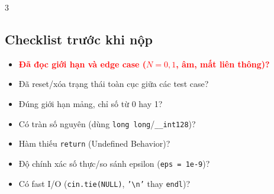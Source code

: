 \documentclass[landscape, 8pt, a4paper, oneside]{extarticle}
\begin{document}
\begin{multicols}{3}
\subsection{Checklist trước khi nộp}
\begin{itemize}
    \setlength{\itemsep}{0pt}
    \setlength{\parsep}{0pt}
    \item \textcolor{red}{\textbf{Đã đọc giới hạn và edge case ($N=0,1$, âm, mất liên thông)?}}
    \item Đã reset/xóa trạng thái toàn cục giữa các test case?
    \item Đúng giới hạn mảng, chỉ số từ 0 hay 1?
    \item Có tràn số nguyên (dùng \texttt{long long}/\texttt{\_\_int128})?
    \item Hàm thiếu \texttt{return} (Undefined Behavior)?
    \item Độ chính xác số thực/so sánh epsilon (\texttt{eps = 1e-9})?
    \item Có fast I/O (\texttt{cin.tie(NULL)}, \texttt{'\textbackslash n'} thay \texttt{endl})?
\end{itemize}

\end{multicols}
\end{document}

